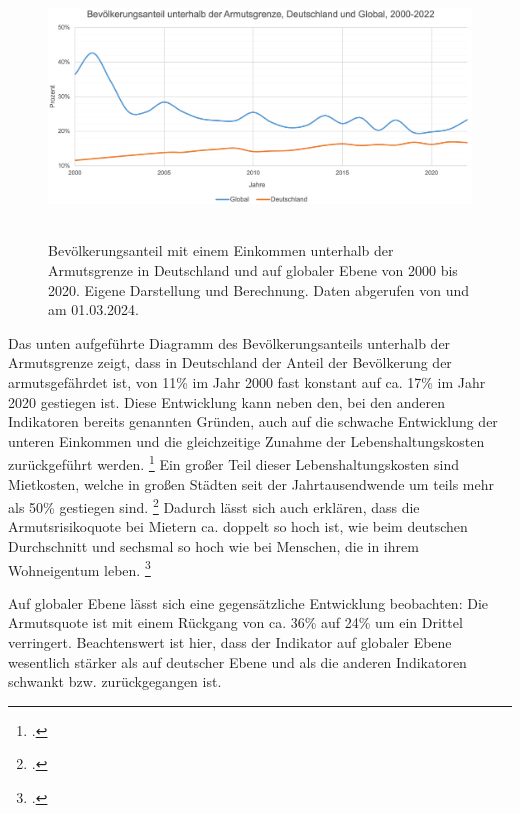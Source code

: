 \begin{figure}[h]
    \centering
    \includegraphics[height=6.9cm]{Bilder/Armutsgrenze2.png}
    \caption[Bevölkerungsanteil unterhalb der Armutsgrenze, Deutschland und global, 2000-2020]{Bevölkerungsanteil mit einem Einkommen unterhalb der Armutsgrenze in Deutschland und auf globaler Ebene von 2000 bis 2020. Eigene Darstellung und Berechnung. Daten abgerufen von \cite[][(global)]{wb_armutsquote_global_2022} und \cite[][(Deutschland)]{bmas_arb_armutsrisikoquote_2023} am 01.03.2024.}
    \label{fig:iso_norm}
\end{figure}

Das unten aufgeführte Diagramm des Bevölkerungsanteils unterhalb der Armutsgrenze zeigt, dass in Deutschland der Anteil der Bevölkerung der armutsgefährdet ist, von 11\% im Jahr 2000 fast konstant auf ca. 17\% im Jahr 2020 gestiegen ist. Diese Entwicklung kann neben den, bei den anderen Indikatoren bereits genannten Gründen, auch auf die schwache Entwicklung der unteren Einkommen und die gleichzeitige Zunahme der Lebenshaltungskosten zurückgeführt werden. \footcite[Vgl. ][S. 17 (Country-Sheets)]{wir_2022} Ein gro{\ss}er Teil dieser Lebenshaltungskosten sind Mietkosten, welche in gro{\ss}en Städten seit der Jahrtausendwende um teils mehr als 50\% gestiegen sind. \footcite[Vgl. ][S. 494]{kholodilin_mietpreisbremse_2016} Dadurch lässt sich auch erklären, dass die Armutsrisikoquote bei Mietern ca. doppelt so hoch ist, wie beim deutschen Durchschnitt und sechsmal so hoch wie bei Menschen, die in ihrem Wohneigentum leben. \footcite[Vgl. ][S. 458]{grabka_einkommensverteilung_2018}

Auf globaler Ebene lässt sich eine gegensätzliche Entwicklung beobachten: Die Armutsquote ist mit einem Rückgang von ca. 36\% auf 24\% um ein Drittel verringert. Beachtenswert ist hier, dass der Indikator auf globaler Ebene wesentlich stärker als auf deutscher Ebene und als die anderen Indikatoren schwankt bzw. zurückgegangen ist. 

